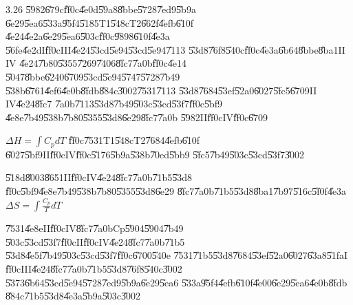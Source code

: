 \documentclass{article}
\begin{document}
\bigskip 

\bigskip 

\bigskip 

3.26 \U{5982}\U{679c}\U{ff0c}\U{4e0d}\U{59a8}\U{8bbe}\U{5728}\U{7ed9}\U{5b9a}%
\U{6e29}\U{5ea6}\U{533a}\U{95f4}\U{5185}T1\U{548c}T2\U{662f}\U{4efb}\U{610f}%
\U{4e24}\U{4e2a}\U{6e29}\U{5ea6}\U{503c}\U{ff0c}\U{9898}\U{610f}\U{4e3a}%
\U{56fe}\U{4e2d}I\U{ff0c}III\U{4e24}\U{53cd}\U{5e94}\U{53cd}\U{5e94}\U{7113}%
\U{53d8}\U{76f8}\U{540c}\U{ff0c}\U{4e3a}\U{6b64}\U{8bbe}\U{8ba1}II IV 
\U{4e24}\U{7b80}\U{5355}\U{7269}\U{7406}\U{8fc7}\U{7a0b}\U{ff0c}\U{4e14}%
\U{5047}\U{8bbe}\U{6240}\U{6709}\U{53cd}\U{5e94}\U{5747}\U{5728}\U{7b49}%
\U{538b}\U{6761}\U{4ef6}\U{4e0b}\U{8fdb}\U{884c}\U{3002}\U{7531}\U{7113}%
\U{53d8}\U{7684}\U{53ef}\U{52a0}\U{6027}\U{5fc5}\U{6709}II IV\U{4e24}\U{8fc7}%
\U{7a0b}\U{7113}\U{53d8}\U{7b49}\U{503c}\U{53cd}\U{53f7}\U{ff0c}\U{5bf9}%
\U{4e8e}\U{7b49}\U{538b}\U{7b80}\U{5355}\U{53d8}\U{6e29}\U{8fc7}\U{7a0b}%
\U{5982}II\U{ff0c}IV\U{ff0c}\U{6709}

$\Delta H=\int C_{p}dT$ \U{ff0c}\U{7531}T1\U{548c}T2\U{7684}\U{4efb}\U{610f}%
\U{6027}\U{5bf9}II\U{ff0c}IV\U{ff0c}\U{5176}\U{5b9a}\U{538b}\U{70ed}\U{5bb9}%
\U{5fc5}\U{7b49}\U{503c}\U{53cd}\U{53f7}\U{3002}

\U{518d}\U{8003}\U{8651}II\U{ff0c}IV\U{4e24}\U{8fc7}\U{7a0b}\U{71b5}\U{53d8}%
\U{ff0c}\U{5bf9}\U{4e8e}\U{7b49}\U{538b}\U{7b80}\U{5355}\U{53d8}\U{6e29}%
\U{8fc7}\U{7a0b}\U{71b5}\U{53d8}\U{8ba1}\U{7b97}\U{516c}\U{5f0f}\U{4e3a} $%
\Delta S=\int \frac{C_{p}}{T}dT$ 

\U{7531}\U{4e8e}II\U{ff0c}IV\U{8fc7}\U{7a0b}Cp\U{5904}\U{5904}\U{7b49}%
\U{503c}\U{53cd}\U{53f7}\U{ff0c}II\U{ff0c}IV\U{4e24}\U{8fc7}\U{7a0b}\U{71b5}%
\U{53d8}\U{4e5f}\U{7b49}\U{503c}\U{53cd}\U{53f7}\U{ff0c}\U{6700}\U{540e}%
\U{7531}\U{71b5}\U{53d8}\U{7684}\U{53ef}\U{52a0}\U{6027}\U{63a8}\U{51fa}I%
\U{ff0c}III\U{4e24}\U{8fc7}\U{7a0b}\U{71b5}\U{53d8}\U{76f8}\U{540c}\U{3002}%
\U{5373}\U{6b64}\U{53cd}\U{5e94}\U{5728}\U{7ed9}\U{5b9a}\U{6e29}\U{5ea6}%
\U{533a}\U{95f4}\U{4efb}\U{610f}\U{4e00}\U{6e29}\U{5ea6}\U{4e0b}\U{8fdb}%
\U{884c}\U{71b5}\U{53d8}\U{4e3a}\U{5b9a}\U{503c}\U{3002}

\end{document}
